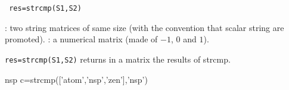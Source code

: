 
\begin{mandesc}
\end{mandesc}
\begin{calling_sequence}
\begin{verbatim}
 res=strcmp(S1,S2)  
\end{verbatim}
\end{calling_sequence}
\begin{parameters}
  \begin{varlist}
    : two string matrices of same size (with the convention that
  scalar string are promoted).
    : a numerical matrix (made of $-1$, $0$ and $1$).
  \end{varlist}
\end{parameters}
\begin{mandescription}
  \verb!res=strcmp(S1,S2)! returns in a matrix the results of strcmp.
\end{mandescription}
\begin{examples}
  \begin{mintednsp}{nsp}
     c=strcmp(['atom','nsp','zen'],'nsp')
  \end{mintednsp}
\end{examples}
\begin{manseealso}
\end{manseealso}

